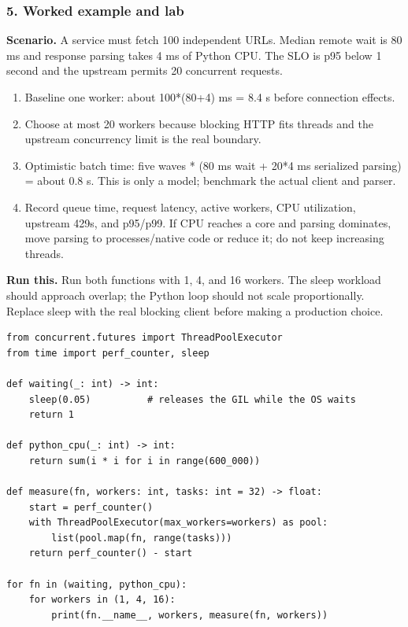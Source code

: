 \subsubsection*{5. Worked example and lab}
\textbf{Scenario.} A service must fetch 100 independent URLs. Median remote wait is 80 ms and response parsing takes 4 ms of Python CPU. The SLO is p95 below 1 second and the upstream permits 20 concurrent requests.
\begin{enumerate}
\item Baseline one worker: about 100*(80+4) ms = 8.4 s before connection effects.
\item Choose at most 20 workers because blocking HTTP fits threads and the upstream concurrency limit is the real boundary.
\item Optimistic batch time: five waves * (80 ms wait + 20*4 ms serialized parsing) = about 0.8 s. This is only a model; benchmark the actual client and parser.
\item Record queue time, request latency, active workers, CPU utilization, upstream 429s, and p95/p99. If CPU reaches a core and parsing dominates, move parsing to processes/native code or reduce it; do not keep increasing threads.
\end{enumerate}
\textbf{Run this.} Run both functions with 1, 4, and 16 workers. The sleep workload should approach overlap; the Python loop should not scale proportionally. Replace sleep with the real blocking client before making a production choice.
\begin{Verbatim}[fontsize=\scriptsize]
from concurrent.futures import ThreadPoolExecutor
from time import perf_counter, sleep

def waiting(_: int) -> int:
    sleep(0.05)          # releases the GIL while the OS waits
    return 1

def python_cpu(_: int) -> int:
    return sum(i * i for i in range(600_000))

def measure(fn, workers: int, tasks: int = 32) -> float:
    start = perf_counter()
    with ThreadPoolExecutor(max_workers=workers) as pool:
        list(pool.map(fn, range(tasks)))
    return perf_counter() - start

for fn in (waiting, python_cpu):
    for workers in (1, 4, 16):
        print(fn.__name__, workers, measure(fn, workers))
\end{Verbatim}
